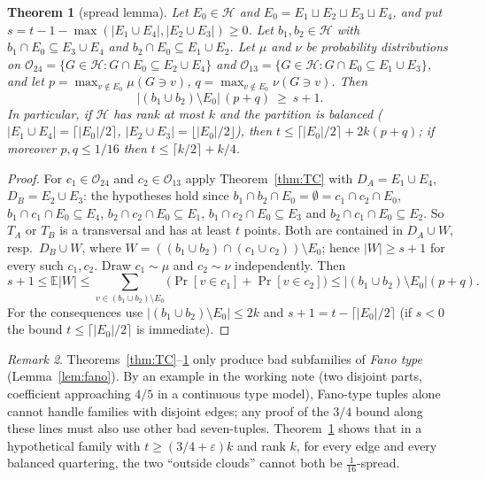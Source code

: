 \documentclass[11pt]{amsart}
\newtheorem{theorem}{Theorem}[section]
\theoremstyle{definition}
\theoremstyle{remark}
\newtheorem{remark}[theorem]{Remark}
\newcommand{\cH}{\mathcal H}
\newcommand{\ceil}[1]{\lceil #1\rceil}
\newcommand{\floor}[1]{\lfloor #1\rfloor}
\begin{document}
\begin{theorem}[spread lemma]\label{thm:spread}
Let $E_0\in\cH$ and $E_0=E_1\sqcup E_2\sqcup E_3\sqcup E_4$, and put $s=t-1-\max(|E_1\cup E_4|,|E_2\cup E_3|)\ge0$. Let $b_1,b_2\in\cH$ with $b_1\cap E_0\subseteq E_3\cup E_4$ and $b_2\cap E_0\subseteq E_1\cup E_2$. Let $\mu$ and $\nu$ be probability distributions on $\mathcal O_{24}=\{G\in\cH:G\cap E_0\subseteq E_2\cup E_4\}$ and $\mathcal O_{13}=\{G\in\cH:G\cap E_0\subseteq E_1\cup E_3\}$, and let $p=\max_{v\notin E_0}\mu(G\ni v)$, $q=\max_{v\notin E_0}\nu(G\ni v)$. Then
\[
|(b_1\cup b_2)\setminus E_0|\,(p+q)\ \ge\ s+1 .
\]
In particular, if $\cH$ has rank at most $k$ and the partition is balanced ($|E_1\cup E_4|=\ceil{|E_0|/2}$, $|E_2\cup E_3|=\floor{|E_0|/2}$), then $t\le\ceil{|E_0|/2}+2k(p+q)$; if moreover $p,q\le1/16$ then $t\le\ceil{k/2}+k/4$.
\end{theorem}
\begin{proof}
For $c_1\in\mathcal O_{24}$ and $c_2\in\mathcal O_{13}$ apply Theorem~\ref{thm:TC} with $D_A=E_1\cup E_4$, $D_B=E_2\cup E_3$: the hypotheses hold since $b_1\cap b_2\cap E_0=\emptyset=c_1\cap c_2\cap E_0$, $b_1\cap c_1\cap E_0\subseteq E_4$, $b_2\cap c_2\cap E_0\subseteq E_1$, $b_1\cap c_2\cap E_0\subseteq E_3$ and $b_2\cap c_1\cap E_0\subseteq E_2$. So $T_A$ or $T_B$ is a transversal and has at least $t$ points. Both are contained in $D_A\cup W$, resp.\ $D_B\cup W$, where $W=((b_1\cup b_2)\cap(c_1\cup c_2))\setminus E_0$; hence $|W|\ge s+1$ for every such $c_1,c_2$. Draw $c_1\sim\mu$ and $c_2\sim\nu$ independently. Then
\[
s+1\le\mathbb E|W|\le\sum_{v\in(b_1\cup b_2)\setminus E_0}\bigl(\Pr[v\in c_1]+\Pr[v\in c_2]\bigr)\le|(b_1\cup b_2)\setminus E_0|(p+q).
\]
For the consequences use $|(b_1\cup b_2)\setminus E_0|\le2k$ and $s+1=t-\ceil{|E_0|/2}$ (if $s<0$ the bound $t\le\ceil{|E_0|/2}$ is immediate).
\end{proof}

\begin{remark}
Theorems~\ref{thm:TC}--\ref{thm:spread} only produce bad subfamilies of \emph{Fano type} (Lemma~\ref{lem:fano}). By an example in the working note (two disjoint parts, coefficient approaching $4/5$ in a continuous type model), Fano-type tuples alone cannot handle families with disjoint edges; any proof of the $3/4$ bound along these lines must also use other bad seven-tuples. Theorem~\ref{thm:spread} shows that in a hypothetical family with $t\ge(3/4+\varepsilon)k$ and rank $k$, for every edge and every balanced quartering, the two ``outside clouds'' cannot both be $\tfrac1{16}$-spread.
\end{remark}
\end{document}
